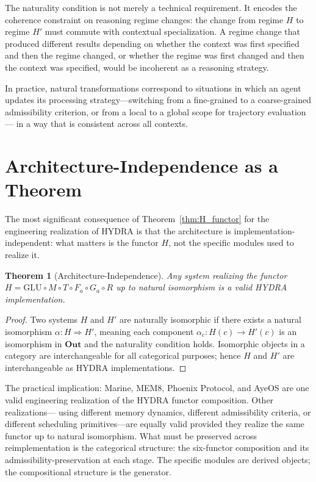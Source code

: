 \documentclass[12pt, oneside]{book}
\theoremstyle{flyxion}
\newtheorem{theorem}{Theorem}[chapter]
\theoremstyle{definition}
\begin{document}
The naturality condition is not merely a technical
requirement. It encodes the coherence constraint on
reasoning regime changes: the change from regime $H$ to
regime $H'$ must commute with contextual specialization.
A regime change that produced different results depending
on whether the context was first specified and then the
regime changed, or whether the regime was first changed
and then the context was specified, would be incoherent
as a reasoning strategy.

In practice, natural transformations correspond to
situations in which an agent updates its processing
strategy---switching from a fine-grained to a
coarse-grained admissibility criterion, or from a
local to a global scope for trajectory evaluation---
in a way that is consistent across all contexts.

\section{Architecture-Independence as a Theorem}

The most significant consequence of Theorem~\ref{thm:H_functor}
for the engineering realization of HYDRA is that the
architecture is implementation-independent: what matters
is the functor $H$, not the specific modules used to
realize it.

\begin{theorem}[Architecture-Independence]
\label{thm:arch_indep}
Any system realizing the functor $H = \mathrm{GLU} \circ
M \circ T \circ F_a \circ G_a \circ R$ up to natural
isomorphism is a valid HYDRA implementation.
\end{theorem}

\begin{proof}
Two systems $H$ and $H'$ are naturally isomorphic if
there exists a natural isomorphism $\alpha : H \Rightarrow H'$,
meaning each component $\alpha_c : H(c) \to H'(c)$ is
an isomorphism in $\mathbf{Out}$ and the naturality
condition holds. Isomorphic objects in a category are
interchangeable for all categorical purposes; hence $H$
and $H'$ are interchangeable as HYDRA implementations.
\end{proof}

The practical implication: Marine, MEM\textbar{}8, Phoenix
Protocol, and AyeOS are one valid engineering realization
of the HYDRA functor composition. Other realizations---
using different memory dynamics, different admissibility
criteria, or different scheduling primitives---are equally
valid provided they realize the same functor up to natural
isomorphism. What must be preserved across reimplementation
is the categorical structure: the six-functor composition
and its admissibility-preservation at each stage. The
specific modules are derived objects; the compositional
structure is the generator.
\end{document}
